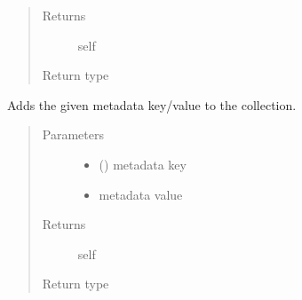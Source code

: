\documentclass[letterpaper,10pt,english]{sphinxmanual}
\begin{document}
\begin{fulllineitems}
\begin{fulllineitems}
\begin{quote}
\begin{description}
\item[{Returns}] \leavevmode
\sphinxAtStartPar
self

\item[{Return type}] \leavevmode
\sphinxAtStartPar
{\hyperref[\detokenize{autoapi/pine/client/models/index:pine.client.models.CollectionBuilder}]{}}

\end{description}\end{quote}

\end{fulllineitems}


\begin{fulllineitems}
\label{\detokenize{autoapi/pine/client/models/index:pine.client.models.CollectionBuilder.metadata}}
\sphinxAtStartPar
Adds the given metadata key/value to the collection.
\begin{quote}\begin{description}
\item[{Parameters}] \leavevmode\begin{itemize}
\item {} 
\sphinxAtStartPar
{} () \textendash{} metadata key

\item {} 
\sphinxAtStartPar
{} \textendash{} metadata value

\end{itemize}

\item[{Returns}] \leavevmode
\sphinxAtStartPar
self

\item[{Return type}] \leavevmode
\sphinxAtStartPar
{\hyperref[\detokenize{autoapi/pine/client/models/index:pine.client.models.CollectionBuilder}]{}}


\end{description}
\end{quote}
\end{fulllineitems}
\end{fulllineitems}
\end{document}
